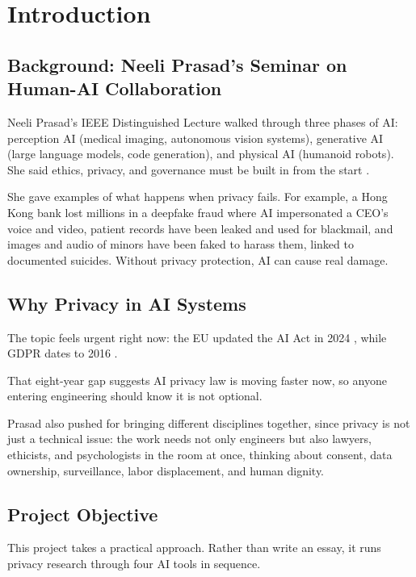 \section{Introduction}

\subsection{Background: Neeli Prasad's Seminar on Human-AI Collaboration}

Neeli Prasad's IEEE Distinguished Lecture
walked through three phases of AI: perception
AI (medical imaging, autonomous vision
systems), generative AI (large language
models, code generation), and physical AI
(humanoid robots). She said ethics, privacy,
and governance must be built in from the start
\cite{prasad2026seminar}.

She gave examples of what happens when privacy
fails. For example, a Hong Kong bank lost
millions in a deepfake fraud where AI
impersonated a CEO's voice and video, patient
records have been leaked and used for
blackmail, and images and audio of minors have
been faked to harass them, linked to
documented suicides. Without privacy
protection, AI can cause real damage.

\subsection{Why Privacy in AI Systems}

The topic feels urgent right now: the EU
updated the AI Act in 2024
\cite{eu_ai_act_2024}, while GDPR dates to 2016
\cite{gdpr2016}.

That eight-year gap suggests AI privacy law is
moving faster now, so anyone entering
engineering should know it is not optional.

Prasad also pushed for bringing different
disciplines together, since privacy is not
just a technical issue: the work needs not only
engineers but also lawyers, ethicists, and
psychologists in the room at once, thinking
about consent, data ownership, surveillance,
labor displacement, and human dignity.

\subsection{Project Objective}
\label{subsec:project-objective}

This project takes a practical approach.
Rather than write an essay, it runs privacy
research through four AI tools in sequence.

